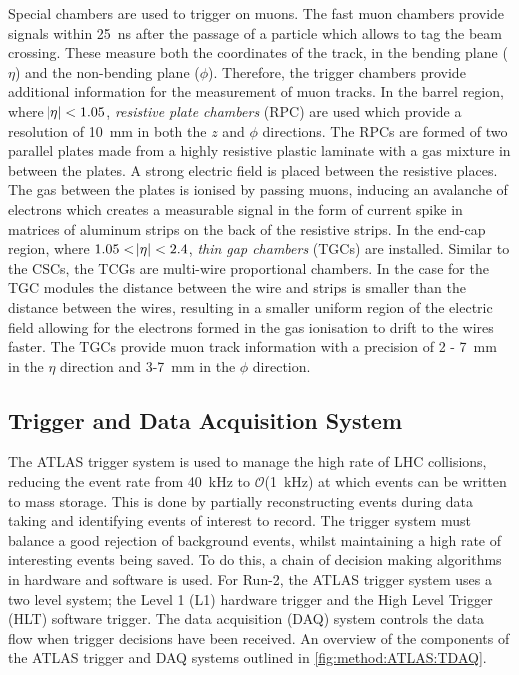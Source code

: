 Special chambers are used to trigger on muons. The fast muon chambers provide signals within \SI{25}{\nano\second} after the passage of a particle which allows to tag the beam crossing. These measure both the coordinates of the track, in the bending plane ($\eta$) and the non-bending plane ($\phi$). Therefore, the trigger chambers provide additional information for the measurement of muon tracks. In the barrel region, where $\abs{\eta} < 1.05$, \emph{resistive plate chambers} (RPC) are used which provide a resolution of \SI{10}{\milli\meter} in both the $z$ and $\phi$ directions. The RPCs are formed of two parallel plates made from a highly resistive plastic laminate with a gas mixture in between the plates. A strong electric field is placed between the resistive places. The gas between the plates is ionised by passing muons, inducing an avalanche of electrons which creates a measurable signal in the form of current spike in matrices of aluminum strips on the back of the resistive strips. In the end-cap region, where $1.05 < \abs{\eta} < 2.4$, \emph{thin gap chambers} (TGCs) are installed. Similar to the CSCs, the TCGs are multi-wire proportional chambers. In the case for the TGC modules the distance between the wire and strips is smaller than the distance between the wires, resulting in a smaller uniform region of the electric field allowing for the electrons formed in the gas ionisation to drift to the wires faster. The TGCs provide muon track information with a precision of 2 - \SI{7}{\milli\meter} in the $\eta$ direction and 3-\SI{7}{\milli\meter} in the $\phi$ direction.

\subsection{Trigger and Data Acquisition System}\label{sec:method:ATLAS:trigger}

The ATLAS trigger system is used to manage the high rate of LHC collisions, reducing the event rate from \SI{40}{\kilo\hertz} to $\mathcal{O}$(\SI{1}{\kilo\hertz}) at which events can be written to mass storage. This is done by partially reconstructing events during data taking and identifying events of interest to record. The trigger system must balance a good rejection of background events, whilst maintaining a high rate of interesting events being saved. To do this, a chain of decision making algorithms in hardware and software is used. For Run-2, the ATLAS trigger system uses a two level system; the Level 1 (L1) hardware trigger and the High Level Trigger (HLT) software trigger. The data acquisition (DAQ) system controls the data flow when trigger decisions have been received. An overview of the components of the ATLAS trigger and DAQ systems outlined in \cref{fig:method:ATLAS:TDAQ}.

